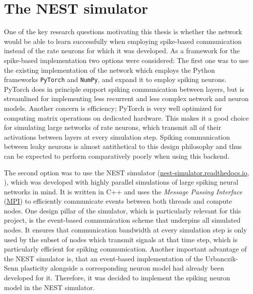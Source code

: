 \section{The NEST simulator}

One of the key research questions motivating this thesis is whether the network would be able to learn successfully when
employing spike-based communication instead of the rate neurons for which it was developed. As a framework for the
spike-based implementation two options were considered: The first one was to use the existing implementation of the
network which employs the Python frameworks \texttt{PyTorch} and \texttt{NumPy}, and expand it to employ spiking
neurons. PyTorch does in principle support spiking communication between layers, but is streamlined for implementing
less recurrent and less complex network and neuron models. Another concern is efficiency; PyTorch is very well optimized
for computing matrix operations on dedicated hardware. This makes it a good choice for simulating large networks of rate
neurons, which transmit all of their activations between layers at every simulation step. Spiking communication between
leaky neurons is almost antithetical to this design philosophy and thus can be expected to perform comparatively poorly
when using this backend.

The second option was to use the NEST simulator
(\href{https://nest-simulator.readthedocs.io}{nest-simulator.readthedocs.io}, \cite{Gewaltig2007}), which was developed
with highly parallel simulations of large spiking neural networks in mind. It is written in C++ and uses the
\textit{Message Passing Interface} (\href{https://www.mpi-forum.org/}{MPI}) to efficiently communicate events between
both threads and compute nodes. One design pillar of the simulator, which is particularly relevant for this project, is
the event-based communication scheme that underpins all simulated nodes. It ensures that communication bandwidth at
every simulation step is only used by the subset of nodes which transmit signals at that time step, which is
particularly efficient for spiking communication. Another important advantage of the NEST simulator is, that an
event-based implementation of the Urbanczik-Senn plasticity alongside a corresponding neuron model had already been
developed for it. Therefore, it was decided to implement the spiking neuron model in the NEST simulator.

